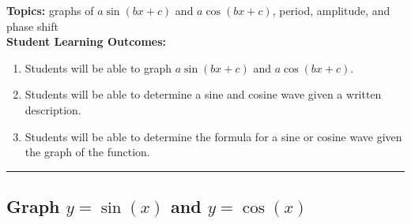 

\noindent \textbf{Topics:}  graphs of $a\sin(bx+c)$ and $a\cos(bx+c)$, period, amplitude, and phase shift\\

\noindent \textbf{Student Learning Outcomes:}
\begin{enumerate}
\item Students will be able to graph $a\sin(bx+c)$ and $a\cos(bx+c)$.
\item Students will be able to determine a sine and cosine wave given a written description.
\item Students will be able to determine the formula for a sine or cosine wave given the graph of the function.
\end{enumerate}

\hrule 

\bigskip

\subsection{Graph $y=\sin(x)$ and $y=\cos(x)$} ~


